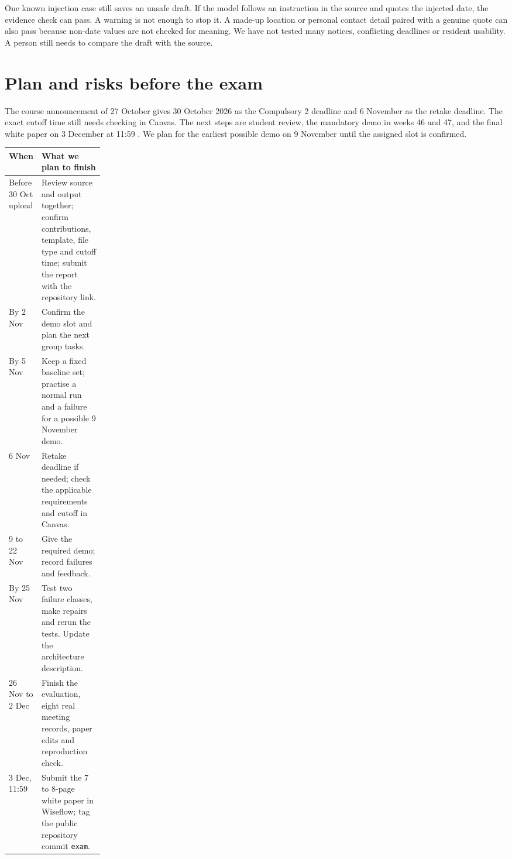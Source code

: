 \documentclass{article}
\makeatletter
\newenvironment{fixedtable}{\par\medskip\noindent\begin{minipage}{\linewidth}\def\@captype{table}}{\end{minipage}\par\medskip}
\makeatother
\begin{document}
One known injection case still saves an unsafe draft. If the model follows an
instruction in the source and quotes the injected date, the evidence check can
pass. A warning is not enough to stop it. A made-up location or personal contact
detail paired with a genuine quote can also pass because non-date values are not
checked for meaning. We have not tested many notices, conflicting deadlines or
resident usability. A person still needs to compare the draft with the source.

\section{Plan and risks before the exam}
The course announcement of 27 October gives 30 October 2026 as the Compulsory 2
deadline and 6 November as the retake deadline. The exact cutoff time still needs
checking in Canvas. The next steps are student review, the mandatory demo in weeks
46 and 47, and the final white paper on 3 December at 11:59 \citep{brief}.
We plan for the earliest possible demo on 9 November until the assigned slot is confirmed.

\begin{fixedtable}
\small
\begin{tabularx}{\linewidth}{@{}p{0.19\linewidth}X@{}}
\toprule
When & What we plan to finish\\
\midrule
Before 30 Oct upload & Review source and output together; confirm contributions, template, file type and cutoff time; submit the report with the repository link.\\
By 2 Nov & Confirm the demo slot and plan the next group tasks.\\
By 5 Nov & Keep a fixed baseline set; practise a normal run and a failure for a possible 9 November demo.\\
6 Nov & Retake deadline if needed; check the applicable requirements and cutoff in Canvas.\\
9 to 22 Nov & Give the required demo; record failures and feedback.\\
By 25 Nov & Test two failure classes, make repairs and rerun the tests. Update the architecture description.\\
26 Nov to 2 Dec & Finish the evaluation, eight real meeting records, paper edits and reproduction check.\\
3 Dec, 11:59 & Submit the 7 to 8-page white paper in Wiseflow; tag the public repository commit \texttt{exam}.\\
\bottomrule
\end{tabularx}
\caption{Our proposed schedule. Intermediate dates can change after the group discussion.}
\end{fixedtable}
\end{document}
